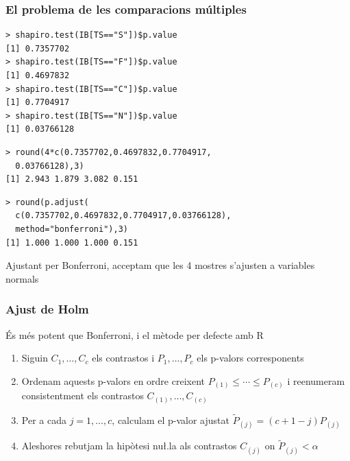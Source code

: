 \documentclass[12pt,t]{beamer}
\renewcommand{\emph}[1]{{\color{red}#1}}
\renewcommand{\leq}{\leqslant}
\theoremstyle{plain}
\theoremstyle{definition}
\begin{document}
\begin{frame}[fragile]
\frametitle{El problema de les comparacions múltiples}\vspace*{-2ex}
\begin{lstlisting}
> shapiro.test(IB[TS=="S"])$p.value
[1] 0.7357702
> shapiro.test(IB[TS=="F"])$p.value
[1] 0.4697832
> shapiro.test(IB[TS=="C"])$p.value
[1] 0.7704917
> shapiro.test(IB[TS=="N"])$p.value
[1] 0.03766128
\end{lstlisting}\pause\vspace*{-1.75ex}
\begin{lstlisting}
> round(4*c(0.7357702,0.4697832,0.7704917,
  0.03766128),3)
[1] 2.943 1.879 3.082 0.151
\end{lstlisting}
\pause\vspace*{-1.75ex}
\begin{lstlisting}
> round(p.adjust(
  c(0.7357702,0.4697832,0.7704917,0.03766128),
  method="bonferroni"),3)
[1] 1.000 1.000 1.000 0.151
\end{lstlisting}

Ajustant per Bonferroni, acceptam que les 4 mostres s'ajusten a variables normals

\end{frame}



 

\begin{frame}
\frametitle{Ajust de Holm}


És més potent que Bonferroni, i el mètode per defecte amb R\medskip

\begin{enumerate}
\item Siguin $C_{1},\ldots ,C_{c}$ els contrastos i $P_{1},\ldots ,P_{c}$ els p-valors corresponents
\medskip

\item Ordenam aquests p-valors en ordre creixent $P_{(1)}\leq \cdots\leq P_{(c)}$ i reenumeram consistentment els contrastos $C_{(1)},\ldots, C_{(c)}$
\medskip

\item Per a cada $j=1,\ldots,c$, calculam el \emph{p-valor ajustat} $\widetilde{P}_{(j)}=(c+1-j)P_{(j)}$
\medskip

\item Aleshores rebutjam la hipòtesi nu\l.la als contrastos $C_{(j)}$ on $\widetilde{P}_{(j)}<\alpha$
 \end{enumerate}


\end{frame}
\end{document}
